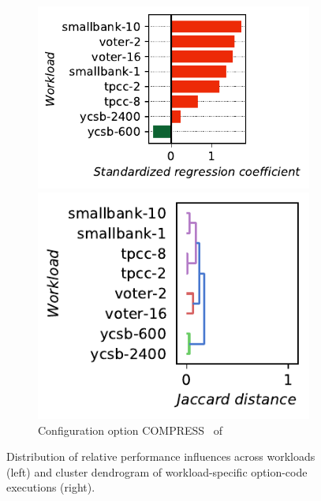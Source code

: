 \begin{figure}
	\begin{subfigure}{0.99\linewidth}
		\begin{minipage}{0.5\linewidth}
			\includegraphics[width=\linewidth]{images/plots/h2_MVSTORE_influences.pdf}
		\end{minipage}
		\begin{minipage}{0.5\linewidth}
			\includegraphics[width=\linewidth]{images/plots/h2_MVSTORE_workloads.pdf}
		\end{minipage}
		\caption{Configuration option \guillemotleft\textsf{COMPRESS}\guillemotright~ of \htwo}
		\label{fig:results_rq3_h2}
	\end{subfigure}
	\caption{Distribution of relative performance influences across workloads (left) and cluster dendrogram of workload-specific option-code executions (right).}
	\label{fig:results_rq3}
\end{figure}

